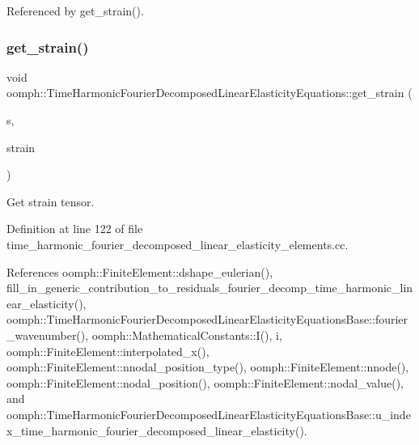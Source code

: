 Referenced by get\+\_\+strain().

\mbox{\label{classoomph_1_1TimeHarmonicFourierDecomposedLinearElasticityEquations_aed013f2b28d4fc1b776763e75104834b}} 
\subsubsection{\texorpdfstring{get\+\_\+strain()}{get\_strain()}}
{\footnotesize\ttfamily void oomph\+::\+Time\+Harmonic\+Fourier\+Decomposed\+Linear\+Elasticity\+Equations\+::get\+\_\+strain (\begin{DoxyParamCaption}\item[{const \hyperlink{classoomph_1_1Vector}{Vector}$<$ double $>$ \&}]{s,  }\item[{\hyperlink{classoomph_1_1DenseMatrix}{Dense\+Matrix}$<$ std\+::complex$<$ double $>$ $>$ \&}]{strain }\end{DoxyParamCaption})}



Get strain tensor. 



Definition at line 122 of file time\+\_\+harmonic\+\_\+fourier\+\_\+decomposed\+\_\+linear\+\_\+elasticity\+\_\+elements.\+cc.



References oomph\+::\+Finite\+Element\+::dshape\+\_\+eulerian(), fill\+\_\+in\+\_\+generic\+\_\+contribution\+\_\+to\+\_\+residuals\+\_\+fourier\+\_\+decomp\+\_\+time\+\_\+harmonic\+\_\+linear\+\_\+elasticity(), oomph\+::\+Time\+Harmonic\+Fourier\+Decomposed\+Linear\+Elasticity\+Equations\+Base\+::fourier\+\_\+wavenumber(), oomph\+::\+Mathematical\+Constants\+::\+I(), i, oomph\+::\+Finite\+Element\+::interpolated\+\_\+x(), oomph\+::\+Finite\+Element\+::nnodal\+\_\+position\+\_\+type(), oomph\+::\+Finite\+Element\+::nnode(), oomph\+::\+Finite\+Element\+::nodal\+\_\+position(), oomph\+::\+Finite\+Element\+::nodal\+\_\+value(), and oomph\+::\+Time\+Harmonic\+Fourier\+Decomposed\+Linear\+Elasticity\+Equations\+Base\+::u\+\_\+index\+\_\+time\+\_\+harmonic\+\_\+fourier\+\_\+decomposed\+\_\+linear\+\_\+elasticity().



